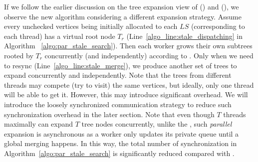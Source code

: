 If we follow the earlier discussion on the tree expansion view of \SeqFullName (\SeqShortName)  and \Hammer (\Hammer), we observe the new algorithm \Hammer considering a different expansion strategy. 
Assume every unchecked vertices being initially allocated to each $LS$ (corresponding to each thread) has a virtual root node $T_r$ (Line~\ref{algo_line:stale_dispatching} in Algorithm ~\ref{algo:par_stale_search}). Then each worker grows their own subtrees rooted by $T_r$ concurrently (and independently) according to \SeqShortName.  
Only when we need to resync (Line~\ref{algo_line:stale_merge}), we produce another set of trees to expand concurrently and independently. 
Note that the trees from different threads may compete (try to visit) the same vertices, but ideally, only one thread will be able to get it. However, this may introduce significant overhead. We will introduce the loosely synchronized communication strategy to reduce such synchronization overhead in the later section. 
Note that even though $T$ threads maximally can expand $T$ tree nodes concurrently, unlike the \Hammer, such {\em parallel} expansion is asynchronous as a worker only updates its private queue until a global merging happens. 
In this way, the total number of synchronization in Algorithm~\ref{algo:par_stale_search} is significantly reduced compared with \Hammer.

